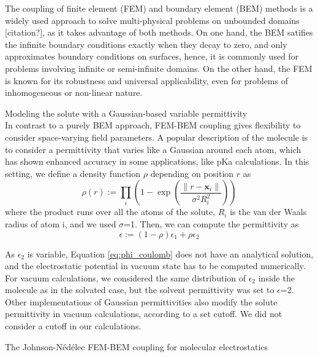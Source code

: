 The coupling of finite element (FEM) and boundary element (BEM) methods is a widely used approach to solve multi-physical problems on unbounded domains [citation?], as it takes advantage of both methods. On one hand, the BEM satifies the infinite boundary conditions exactly when they decay to zero, and only approximates boundary conditions on surfaces, hence, it is commonly used for problems involving infinite or semi-infinite domains. On the other hand, the FEM is known for its robustness and universal applicability, even for problems of inhomogeneous or non-linear nature.
    
    
{\sffamily \small Modeling the solute with a Gaussian-based variable permittivity}\\

In contrast to a purely BEM approach, FEM-BEM coupling gives flexibility to consider space-varying field parameters. 
A popular description of the molecule is to consider a permittivity that varies like a Gaussian around each atom,\cite{grant2001smooth} which has shown enhanced accuracy in some applications, like pKa calculations.\cite{li2013dielectric}
In this setting, we define a density function $\rho$ depending on position $r$ as
%
\begin{equation}
\rho(r) := \prod_i \left(1 - \exp{\left(\frac{\|r-\mathbf{x}_i\|}{\sigma^2 R_i^2}\right)}\right)
\end{equation}
%
where the product runs over all the atoms of the solute, $R_i$ is the van der Waals radius of atom i, and we used $\sigma$=1. Then, we can compute the permittivity as
%
\begin{equation}\label{eq:varying_eps}
\epsilon := \left(1-\rho \right) \epsilon_1 + \rho\epsilon_2
\end{equation}

As $\epsilon_2$ is variable, Equation \eqref{eq:phi_coulomb} does not have an analytical solution, and the electrostatic potential in vacuum state has to be computed numerically.
For vacuum calculations, we considered the same distribution of $\epsilon_2$ inside the molecule as in the solvated case, but the solvent permittivity was set to $\epsilon$=2. 
Other implementations of Gaussian permittivities also modify the solute permittivity in vacuum calculations, according to a set cutoff.\cite{li2013dielectric} We did not consider a cutoff in our calculations.



{\sffamily \small The Johnson-N\'ed\'elec FEM-BEM coupling for molecular electrostatics}\\

